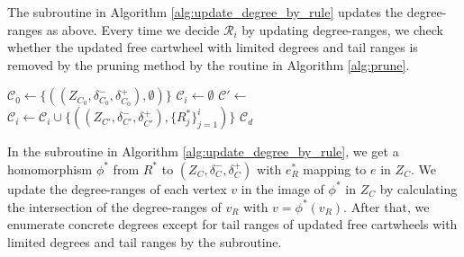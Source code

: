 \documentclass[main.tex]{subfiles}
\begin{document}
The \updateDegreeByRule subroutine in Algorithm \ref{alg:update_degree_by_rule} updates the degree-ranges as above.
Every time we decide $\mathcal{R}_i$ by updating degree-ranges, we check whether the updated free cartwheel with limited degrees and tail ranges is removed by the pruning method by the \prune routine in Algorithm \ref{alg:prune}.

\begin{algorithm}[H]
    \caption{\fixInRulesWithLink($(Z_{C_0}, \delta_{C_0}^-, \delta_{C_0}^+), \mathcal{R}, \mathcal{R}^{*-\mathcal{D}}, \bar{\mathcal{D}}$)}
    \label{alg:fix_in_rules}
    \begin{algorithmic}[1]
        \State $\mathcal{C}_0 \gets \{((Z_{C_0}, \delta_{C_0}^-, \delta_{C_0}^+), \emptyset)\}$
            \State $\mathcal{C}_i \gets \emptyset$
                    \State $\mathcal{C}' \gets$ 
                            \Continue
                        \EndIf
                        \State $\mathcal{C}_i \gets \mathcal{C}_i \cup \{((Z_{C'}, \delta_{C'}^-, \delta_{C'}^+), \{R_j^*\}_{j=1}^i)\}$
                    \EndFor
                \EndFor
            \EndFor
        \EndFor
        \State \Return $\mathcal{C}_d$
    \end{algorithmic}
\end{algorithm}

In the \updateDegreeByRule subroutine in Algorithm \ref{alg:update_degree_by_rule}, we get a homomorphism $\phi^*$ from $R^*$ to $(Z_C, \delta_C^-, \delta_C^+)$ with $e_R^*$ mapping to $e$ in $Z_C$.
We update the degree-ranges of each vertex $v$ in the image of $\phi^*$ in $Z_C$ by calculating the intersection of the degree-ranges of $v_R$ with $v=\phi^*(v_R)$.
After that, we enumerate concrete degrees except for tail ranges of updated free cartwheels with limited degrees and tail ranges by the \concreteDegreesExceptTail subroutine.
\end{document}
